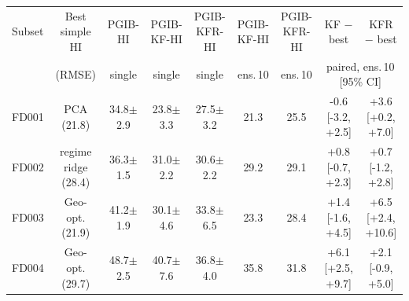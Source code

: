\begin{tabular}{l c c c c c c c c}
\hline
Subset & Best simple HI & PGIB-HI & PGIB-KF-HI & PGIB-KFR-HI & PGIB-KF-HI & PGIB-KFR-HI & KF $-$ best & KFR $-$ best \\
 & (RMSE) & single & single & single & ens.\,10 & ens.\,10 & \multicolumn{2}{c}{paired, ens.\,10 [95\% CI]} \\
\hline
FD001 & PCA (21.8) & 34.8$\pm$2.9 & 23.8$\pm$3.3 & 27.5$\pm$3.2 & 21.3 & 25.5 & -0.6 [-3.2, +2.5] & +3.6 [+0.2, +7.0] \\
FD002 & regime ridge (28.4) & 36.3$\pm$1.5 & 31.0$\pm$2.2 & 30.6$\pm$2.2 & 29.2 & 29.1 & +0.8 [-0.7, +2.3] & +0.7 [-1.2, +2.8] \\
FD003 & Geo-opt. (21.9) & 41.2$\pm$1.9 & 30.1$\pm$4.6 & 33.8$\pm$6.5 & 23.3 & 28.4 & +1.4 [-1.6, +4.5] & +6.5 [+2.4, +10.6] \\
FD004 & Geo-opt. (29.7) & 48.7$\pm$2.5 & 40.7$\pm$7.6 & 36.8$\pm$4.0 & 35.8 & 31.8 & +6.1 [+2.5, +9.7] & +2.1 [-0.9, +5.0] \\
\hline
\end{tabular}
